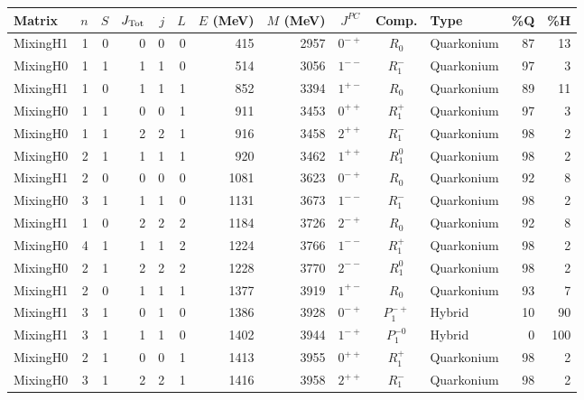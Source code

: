 \documentclass[11pt, a4paper]{article}
\begin{document}
\begin{table}[p]
\centering
\scriptsize
\setlength{\tabcolsep}{4pt}
\begin{tabular}{l r r r r r r r c c l r r}
\toprule
Matrix & $n$ & $S$ & $J_{\rm Tot}$ & $j$ & $L$ & $E$ (MeV) & $M$ (MeV) & $J^{PC}$ & Comp. & Type & \%Q & \%H \\
\midrule
\rowcolor{cyan!12} MixingH1 & 1 & 0 & 0 & 0 & 0 & 415 & 2957 & $0^{-+}$ & $R_0$ & Quarkonium & 87 & 13 \\
\rowcolor{cyan!12} MixingH0 & 1 & 1 & 1 & 1 & 0 & 514 & 3056 & $1^{--}$ & $R_1^{-}$ & Quarkonium & 97 & 3 \\
\rowcolor{cyan!12} MixingH1 & 1 & 0 & 1 & 1 & 1 & 852 & 3394 & $1^{+-}$ & $R_0$ & Quarkonium & 89 & 11 \\
\rowcolor{cyan!12} MixingH0 & 1 & 1 & 0 & 0 & 1 & 911 & 3453 & $0^{++}$ & $R_1^{+}$ & Quarkonium & 97 & 3 \\
\rowcolor{cyan!12} MixingH0 & 1 & 1 & 2 & 2 & 1 & 916 & 3458 & $2^{++}$ & $R_1^{-}$ & Quarkonium & 98 & 2 \\
\rowcolor{cyan!12} MixingH0 & 2 & 1 & 1 & 1 & 1 & 920 & 3462 & $1^{++}$ & $R_1^{0}$ & Quarkonium & 98 & 2 \\
\rowcolor{cyan!12} MixingH1 & 2 & 0 & 0 & 0 & 0 & 1081 & 3623 & $0^{-+}$ & $R_0$ & Quarkonium & 92 & 8 \\
\rowcolor{cyan!12} MixingH0 & 3 & 1 & 1 & 1 & 0 & 1131 & 3673 & $1^{--}$ & $R_1^{-}$ & Quarkonium & 98 & 2 \\
\rowcolor{cyan!12} MixingH1 & 1 & 0 & 2 & 2 & 2 & 1184 & 3726 & $2^{-+}$ & $R_0$ & Quarkonium & 92 & 8 \\
\rowcolor{cyan!12} MixingH0 & 4 & 1 & 1 & 1 & 2 & 1224 & 3766 & $1^{--}$ & $R_1^{+}$ & Quarkonium & 98 & 2 \\
\rowcolor{cyan!12} MixingH0 & 2 & 1 & 2 & 2 & 2 & 1228 & 3770 & $2^{--}$ & $R_1^{0}$ & Quarkonium & 98 & 2 \\
\rowcolor{cyan!12} MixingH1 & 2 & 0 & 1 & 1 & 1 & 1377 & 3919 & $1^{+-}$ & $R_0$ & Quarkonium & 93 & 7 \\
\rowcolor{red!12} MixingH1 & 3 & 1 & 0 & 1 & 0 & 1386 & 3928 & $0^{-+}$ & $P_1^{-+}$ & Hybrid & 10 & 90 \\
\rowcolor{red!12} MixingH1 & 3 & 1 & 1 & 1 & 0 & 1402 & 3944 & $1^{-+}$ & $P_1^{-0}$ & Hybrid & 0 & 100 \\
\rowcolor{cyan!12} MixingH0 & 2 & 1 & 0 & 0 & 1 & 1413 & 3955 & $0^{++}$ & $R_1^{+}$ & Quarkonium & 98 & 2 \\
\rowcolor{cyan!12} MixingH0 & 3 & 1 & 2 & 2 & 1 & 1416 & 3958 & $2^{++}$ & $R_1^{-}$ & Quarkonium & 98 & 2 \\

\end{tabular}
\end{table}
\end{document}

